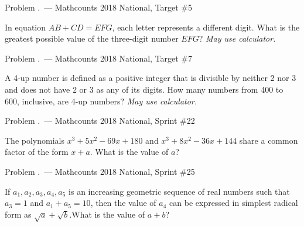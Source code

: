 \documentclass[9pt]{beamer}
\newcounter{problem}[section]
\begin{document}
\begin{frame}[t, fragile]{Problem \thesection.\theproblem\ ---  Mathcounts 2018 National, Target \#5}
    \begin{block}{}
    In equation $ AB+CD=EFG $, each letter represents a different digit. What is the greatest possible value of the three-digit number $ EFG $? \textit{May use calculator.}
    
    \end{block}
\end{frame}



\begin{frame}[t, fragile]{Problem \thesection.\theproblem\ ---  Mathcounts 2018 National, Target \#7}
    \begin{block}{}
    A 4-up number is defined as a positive integer that is divisible by neither 2 nor 3 and does not have 2 or 3 as any of its digits. How many numbers from 400 to 600, inclusive, are 4-up numbers? \textit{May use calculator.}
    
    \end{block}
\end{frame}

\begin{frame}[t, fragile]{Problem \thesection.\theproblem\ ---  Mathcounts 2018 National, Sprint \#22}
    \begin{block}{}
    The polynomials $ x^3+5x^2-69x+180 $ and $ x^3+8x^2-36x+144 $ share a common
factor of the form $ x + a $. What is the value of $ a $?
    
    \end{block}
\end{frame}


\begin{frame}[t, fragile]{Problem \thesection.\theproblem\ ---  Mathcounts 2018 National, Sprint \#25}
    \begin{block}{}
    If $ a_1,a_2,a_3,a_4,a_5 $ is an increasing geometric sequence of real numbers such that
$ a_3=1 $ and $ a_1+a_5=10 $, then the value of $ a_4 $ can be expressed in simplest radical
form as $ \sqrt{a} + \sqrt{b} $.What is the value of $ a+b $?
    
    \end{block}
\end{frame}
\end{document}
